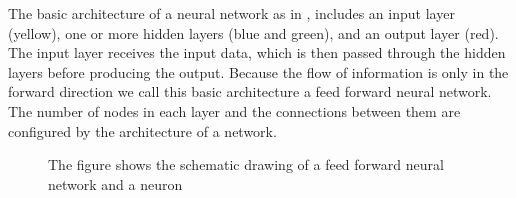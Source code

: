The basic architecture of a neural network as in ,  includes an input layer (yellow), one or more hidden layers (blue and green), and an output layer (red). The input layer receives the input data, which is then passed through the hidden layers before producing the output. Because the flow of information is only in the forward direction we call this basic architecture a feed forward neural network. The number of nodes in each layer and the connections between them are configured by the architecture of a network.
\begin{figure}
    \begin{center}
        \hfill
    \end{center}
    \caption[Schematic architecture of neural network and neuron]{The figure shows the schematic drawing of a feed forward neural network and a neuron}
    \label{fig:neural_architecture}
\end{figure}

